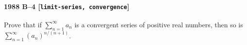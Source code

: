 \paragraph{1988 B--4 \textnormal{[\texttt{limit-series, convergence}]}}
Prove that if $\sum_{n=1}^\infty a_n$ is a convergent series of
positive real numbers, then so is $\sum_{n=1}^\infty (a_n)^{n/(n+1)}$.
